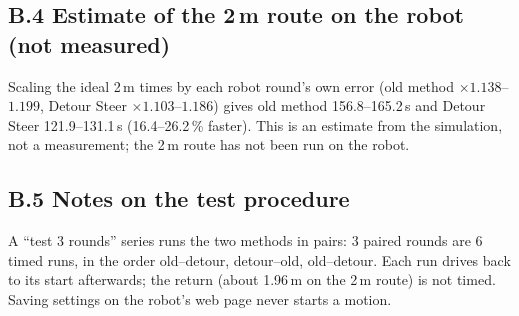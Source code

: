 \documentclass[11pt,a4paper]{article}
\begin{document}
\subsection*{B.4 Estimate of the 2\,m route on the robot (not measured)}
Scaling the ideal 2\,m times by each robot round's own error (old method $\times 1.138$--$1.199$, Detour Steer
$\times 1.103$--$1.186$) gives old method 156.8--165.2\,s and Detour Steer 121.9--131.1\,s (16.4--26.2\,\% faster).
This is an estimate from the simulation, not a measurement; the 2\,m route has not been run on the robot.

\subsection*{B.5 Notes on the test procedure}
A ``test 3 rounds'' series runs the two methods in pairs: 3 paired rounds are 6 timed runs, in the order
old--detour, detour--old, old--detour. Each run drives back to its start afterwards; the return (about 1.96\,m on
the 2\,m route) is not timed. Saving settings on the robot's web page never starts a motion.
\end{document}
